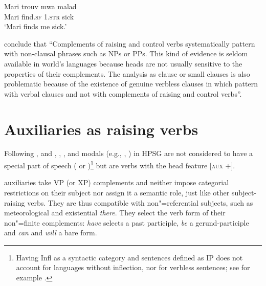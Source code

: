 \ex 
\gll Mari trouv              mwa               malad\\
     Mari find.\textsc{sf}  1\SG.\textsc{str} sick\\
\glt `Mari finds me sick.' \label{ex-anne4}
\zl

\citet[]{HenriandLaurens2011} conclude that ``Complements of raising and control verbs
systematically pattern with non-clausal phrases such as NPs or PPs. This kind of evidence is seldom
available in world's languages because heads are not usually sensitive to the properties of their
complements. The analysis as clause or small clauses is also problematic because of the existence of
genuine verbless clauses in  which pattern with verbal clauses and not with
complements of raising and control verbs''.


\section{Auxiliaries as raising verbs}
\label{sec-auxiliaries-as-raising-verbs}

Following \citet{Ross69a-u}, \citet{Gazdaretal1982} and \citet{Sagetal2020}, , ,  and
modals (e.g., , ) in HPSG are not considered to have a special part of speech
( or )\footnote{Having Infl as a syntactic category and sentences defined as IP does not account for languages without inflection, nor for verbless sentences; see for example .} but are verbs with the head feature [\textsc{aux} $+$].
 
  auxiliaries take VP (or XP) complements and neither impose categorial restrictions on their subject nor assign it a semantic role,
   just like
 other subject-raising verbs. They are thus compatible with non"=referential subjects, such as
 meteorological  and existential \textit{there}. They select the verb form of their
 non"=finite complements: \textit{have} selects a past participle, \textit{be} a gerund-participle and
 \textit{can} and \textit{will} a bare form.

